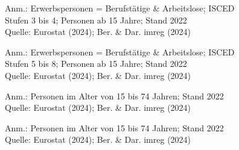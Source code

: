 \begin{figure}[p]
	{\centering {}}
	\label{map:erwerbspersmittel}
	\begin{spacing}{1} \scriptsize
		Anm.: Erwerbspersonen = Berufstätige \& Arbeitslose; ISCED Stufen 3 bis 4; Personen ab 15 Jahre; Stand 2022\\
		Quelle: Eurostat (2024); Ber. \& Dar. imreg (2024) \end{spacing}
\end{figure}


\begin{figure}[p]
	{\centering {}}
	\label{map:erwerbspershoch}
	\begin{spacing}{1} \scriptsize
		Anm.: Erwerbspersonen = Berufstätige \& Arbeitslose; ISCED Stufen 5 bis 8; Personen ab 15 Jahre; Stand 2022\\
		Quelle: Eurostat (2024); Ber. \& Dar. imreg (2024) \end{spacing}
\end{figure}


\begin{figure}[p]
	{\centering {}}
	\label{map:arbeitslosenquote}
	\begin{spacing}{1} \scriptsize
		Anm.: Personen im Alter von 15 bis 74 Jahren; Stand 2022\\
		Quelle: Eurostat (2024); Ber. \& Dar. imreg (2024) \end{spacing}
\end{figure}


\begin{figure}[p]
	{\centering {}}
	\label{map:arbeitslosenquotefrauen}
	\begin{spacing}{1} \scriptsize
		Anm.: Personen im Alter von 15 bis 74 Jahren; Stand 2022\\
		Quelle: Eurostat (2024); Ber. \& Dar. imreg (2024) \end{spacing}
\end{figure}


